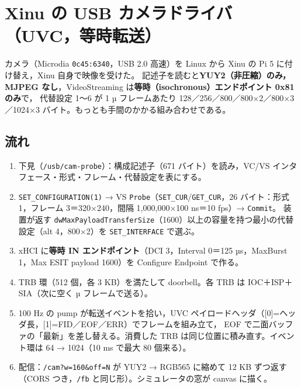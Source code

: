 \documentclass[a4paper,11pt]{article}
\begin{document}
\section{Xinu の USB カメラドライバ（UVC，等時転送）}\label{sec:uvc}
カメラ（Microdia \texttt{0c45:6340}，USB 2.0 高速）を Linux から Xinu の Pi 5 に付け替え，Xinu 自身で映像を受けた。
記述子を読むと\textbf{YUY2（非圧縮）のみ，MJPEG なし}，VideoStreaming は\textbf{等時（isochronous）エンドポイント 0x81 のみ}で，
代替設定 1〜6 が 1 µ フレームあたり 128／256／800／800×2／800×3／1024×3 バイト。もっとも手間のかかる組み合わせである。

\subsection*{流れ}
\begin{enumerate}
  \item 下見（\texttt{/usb/cam-probe}）：構成記述子（671 バイト）を読み，VC/VS インタフェース・形式・フレーム・代替設定を表にする。
  \item \texttt{SET\_CONFIGURATION(1)} → VS \texttt{Probe}（\texttt{SET\_CUR}/\texttt{GET\_CUR}，26 バイト：形式 1，フレーム 3＝320×240，間隔 1,000,000×100 ns＝10 fps）→ \texttt{Commit}。
        装置が返す \texttt{dwMaxPayloadTransferSize}（1600）以上の容量を持つ最小の代替設定（alt 4，800×2）を \texttt{SET\_INTERFACE} で選ぶ。
  \item xHCI に\textbf{等時 IN エンドポイント}（DCI 3，Interval 0＝125 µs，MaxBurst 1，Max ESIT payload 1600）を Configure Endpoint で作る。
  \item TRB 環（512 個，各 3 KB）を満たして doorbell。各 TRB は IOC＋ISP＋SIA（次に空く µ フレームで送る）。
  \item 100 Hz の pump が転送イベントを拾い，UVC ペイロードヘッダ（[0]=ヘッダ長，[1]=FID／EOF／ERR）でフレームを組み立て，
        EOF で二面バッファの「最新」を差し替える。消費した TRB は同じ位置に積み直す。イベント環は 64 → 1024（10 ms で最大 80 個来る）。
  \item 配信：\texttt{/cam?w=160\&off=N} が YUY2 → RGB565 に縮めて 12 KB ずつ返す（CORS つき，\texttt{/fb} と同じ形）。シミュレータの窓が canvas に描く。
\end{enumerate}
\end{document}
